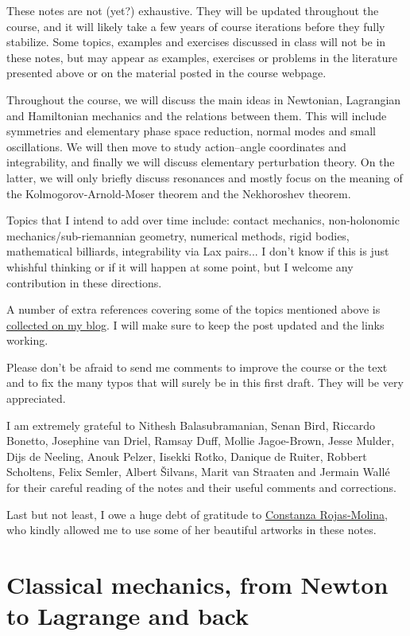 \documentclass[english,fontsize=11pt,paper=a5,oneside]{scrbook}
\theoremstyle{definition}
\begin{document}
These notes are not (yet?) exhaustive.
They will be updated throughout the course, and it will likely take a few years of course iterations before they fully stabilize.
Some topics, examples and exercises discussed in class will not be in these notes, but may appear as examples, exercises or problems in the literature presented above or on the material posted in the course webpage.

Throughout the course, we will discuss the main ideas in Newtonian, Lagrangian and Hamiltonian mechanics and the relations between them.
This will include symmetries and elementary phase space reduction, normal modes and small oscillations.
We will then move to study action--angle coordinates and integrability, and finally we will discuss elementary perturbation theory.
On the latter, we will only briefly discuss resonances and mostly focus on the meaning of the Kolmogorov-Arnold-Moser theorem and the Nekhoroshev theorem.

Topics that I intend to add over time include: contact mechanics, non-holonomic mechanics/sub-riemannian geometry, numerical methods, rigid bodies, mathematical billiards, integrability via Lax pairs... I don't know if this is just whishful thinking or if it will happen at some point, but I welcome any contribution in these directions.

A number of extra references covering some of the topics mentioned above is \href{https://www.mseri.me/links-from-hm/}{collected on my blog}. I will make sure to keep the post updated and the links working. \medskip

Please don't be afraid to send me comments to improve the course or the text and to fix the many typos that will surely be in this first draft. They will be very appreciated.

I am extremely grateful to Nithesh Balasubramanian, Senan Bird, Riccardo Bonetto, Josephine van Driel, Ramsay Duff, Mollie Jagoe-Brown, Jesse Mulder, Dijs de Neeling, Anouk Pelzer, Iisekki Rotko, Danique de Ruiter, Robbert Scholtens, Felix Semler, Albert \v{S}ilvans, Marit van Straaten and Jermain Wall\'e for their careful reading of the notes and their useful comments and corrections.

Last but not least, I owe a huge debt of gratitude to \href{https://crojasmolina.com}{Constanza Rojas-Molina}, who kindly allowed me to use some of her beautiful artworks in these notes.

\chapter{Classical mechanics, from Newton to Lagrange and back}
\end{document}

